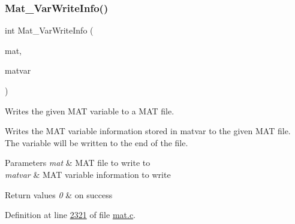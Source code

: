 \subsubsection{\texorpdfstring{Mat\+\_\+\+Var\+Write\+Info()}{Mat\_VarWriteInfo()}}
{\footnotesize\ttfamily int Mat\+\_\+\+Var\+Write\+Info (\begin{DoxyParamCaption}\item[{\hyperlink{group___m_a_t_gab0fc888f5a5d79943b16284b1f91c2e8}{mat\+\_\+t} $\ast$}]{mat,  }\item[{\hyperlink{group___m_a_t_structmatvar__t}{matvar\+\_\+t} $\ast$}]{matvar }\end{DoxyParamCaption})}



Writes the given M\+AT variable to a M\+AT file. 

Writes the M\+AT variable information stored in matvar to the given M\+AT file. The variable will be written to the end of the file.


\begin{DoxyParams}{Parameters}
{\em mat} & M\+AT file to write to \\
\hline
{\em matvar} & M\+AT variable information to write \\
\hline
\end{DoxyParams}

\begin{DoxyRetVals}{Return values}
{\em 0} & on success \\
\hline
\end{DoxyRetVals}


Definition at line \hyperlink{mat_8c_source_l02321}{2321} of file \hyperlink{mat_8c_source}{mat.\+c}.

